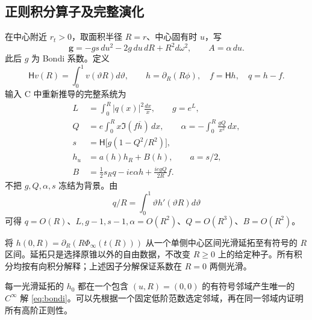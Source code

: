 \subsection{正则积分算子及完整演化}
在中心附近 $r_t>0$，取面积半径 $R=r$、中心固有时 $u$，写
\[
\mathbf g=-gs\,du^2-2g\,du\,dR+R^2d\omega^2,
\qquad A=\alpha\,du.
\]
此后 $g$ 为 Bondi 系数。定义
\[
\mathsf Hv(R)=\int_0^1v(\vartheta R)d\vartheta,\qquad
h=\partial_R(R\phi),\quad f=\mathsf Hh,\quad q=h-f.
\]
输入 C 中重新推导的完整系统为
\begin{equation}\label{eq:bondi}
\begin{split}
L&=\int_0^R|q(x)|^2\frac{dx}{x},\qquad g=e^L,\\
Q&=e\int_0^R x\Im(f\overline h)\,dx,\qquad
\alpha=-\int_0^R\frac{gQ}{x^2}\,dx,\\
s&=\mathsf H\big[g(1-Q^2/R^2)\big],\\
h_u&=a(h)h_R+B(h),\qquad a=s/2,\\
B&=\tfrac12s_Rq-ie\alpha h+\frac{ie gQ}{2R}f.
\end{split}
\end{equation}
不把 $g,Q,\alpha,s$ 冻结为背景。由
\[
q/R=\int_0^1\vartheta h'(\vartheta R)d\vartheta
\]
可得 $q=O(R)$、$L,g-1,s-1,\alpha=O(R^2)$、$Q=O(R^3)$、$B=O(R^2)$。

将 $h(0,R)=\partial_R(R\Phi_\infty(t(R)))$ 从一个单侧中心区间光滑延拓至有符号的 $R$ 区间。延拓只是选择原锥以外的自由数据，不改变 $R\ge0$ 上的给定种子。所有积分均按有向积分解释；上述因子分解保证系数在 $R=0$ 两侧光滑。

\begin{lemma}[共同存在区间]\label{lem:local}
每一光滑延拓的 $h_0$ 都在一个包含 $(u,R)=(0,0)$ 的有符号邻域产生唯一的 $C^\infty$ 解 \eqref{eq:bondi}。可以先根据一个固定低阶范数选定邻域，再在同一邻域内证明所有高阶正则性。
\end{lemma}

